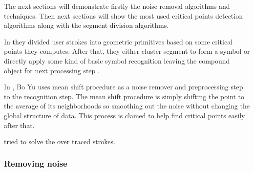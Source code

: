 
The next sections will demonstrate firstly the noise removal algorithms and techniques. Then next sections will show the most used critical points detection algorithms along with the segment division algorithms. 


  In\cite{sketchRead29} they divided user strokes into geometric primitives based on some critical points they computes.  After that, they either cluster segment to form a symbol   or directly apply some kind of basic symbol recognition leaving the compound object for next processing step .
  






In \cite{meanshift10,domainindependent17}, Bo Yu uses mean shift procedure as a noise remover and preprocessing step to the recognition step. The mean shift procedure is simply shifting the point to the average of its neighborhoods so smoothing out the noise without changing the global structure of data.  This process is clamed to help find critical points easily after that.  %


 \cite {overtraced24} tried to solve the over traced strokes. 

\subsubsection{Removing noise}
\label{sec:RemovingNoise}

